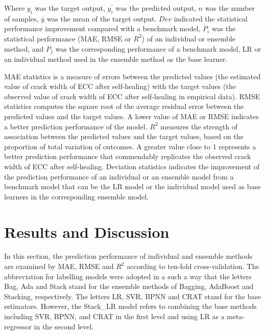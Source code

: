 \documentclass[11pt]{article}
\begin{document}
	Where $y_i$ was the target output, $y_i^{'}$ was the predicted output, $n$ was the number of samples, $\overline{y}$ was the mean of the target output. $Dev$ indicated the statistical performance improvement compared with a benchmark model, $P_i$ was the statistical performance (MAE, RMSE or  $R^2$) of an individual or ensemble method, and $P_j$ was the corresponding performance of a benchmark model, LR or an individual method used in the ensemble method as the base learner.
	
	MAE statistics is a measure of errors between the predicted values (the estimated value of crack width of ECC after self-healing) with the target  values (the observed value of crack width of ECC after self-healing in empirical data). RMSE statistics computes the square root of the average residual error between the predicted values and the target values. A lower value of MAE or RMSE indicates a better prediction performance of the model. $R^2$ measures the strength of association between the predicted values and the target values, based on the proportion of total variation of outcomes. A greater value close to 1 represents a better prediction performance that commendably replicates the observed crack width of ECC after self-healing.  Deviation statistics indicates the improvement of the prediction performance of an individual or an ensemble model from a benchmark model that can be the LR model or the individual model used as base learners in the corresponding ensemble model. 
	
	
	
	
	\section{Results and Discussion}
	\label{result}

	In this section, the prediction performance of individual and ensemble methods are examined by MAE, RMSE and $R^2$ according to ten-fold cross-validation. The abbreviation for labelling models were adopted in a such a way that the letters Bag, Ada and Stack stand for the ensemble methods of Bagging, AdaBoost and Stacking, respectively. The letters LR, SVR, BPNN and CRAT stand for the base estimators. However, the Stack\_LR model refers to combining the base methods including SVR, BPNN, and CRAT in the first level and using LR as a meta-regressor in the second level.
	
\end{document}
